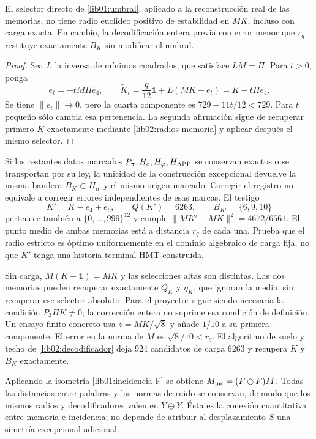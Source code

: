 \begin{proposition}
\label{lib01:umbral-estable}
El selector directo de \eqref{lib01:umbral}, aplicado a la reconstrucción
real de las memorias, no tiene radio euclídeo positivo de estabilidad en
\(MK\), incluso con carga exacta. En cambio, la decodificación entera
previa con error menor que \(r_q\) restituye exactamente \(B_K\)
sin modificar el umbral.
\end{proposition}
\begin{proof}
Sea \(L\) la inversa de mínimos cuadrados, que satisface
\(LM=\Pi\). Para \(t>0\), ponga
\[
 e_t=-tM\Pi e_4,
 \qquad \widetilde K_t=\frac q{12}\mathbf1+L(MK+e_t)
 =K-t\Pi e_4.
\]
Se tiene \(\|e_t\|\to0\), pero la cuarta componente es
\(729-11t/12<729\). Para \(t\) pequeño sólo cambia esa pertenencia.
La segunda afirmación sigue de recuperar primero \(K\) exactamente
mediante \cref{lib02:radios-memoria} y aplicar después el mismo selector.
\end{proof}

Si los restantes datos marcados \(P_\pi,H_e,H_\varphi,H_{\rm APP}\)
se conservan exactos o se transportan por su ley, la unicidad de la
construcción excepcional devuelve la misma bandera
\(B_K\subset H^-_\alpha\) y el mismo origen marcado. Corregir el
registro no equivale a corregir errores independientes de esas marcas.
El testigo
\[
 K'=K-e_4+e_6,
 \qquad Q(K')=6263,\qquad B_{K'}=\{6,9,10\}
\]
pertenece también a \(\{0,\ldots,999\}^{12}\) y cumple
\(\|MK'-MK\|^2=4672/6561\). El punto medio de ambas memorias está
a distancia \(r_q\) de cada una. Prueba que el radio estricto es
óptimo uniformemente en el dominio algebraico de carga fija, no que
\(K'\) tenga una historia terminal HMT construida.

Sin carga, \(M(K-\mathbf1)=MK\) y las selecciones altas son distintas.
Las dos memorias pueden recuperar exactamente \(Q_K\) y \(\eta_K\),
que ignoran la media, sin recuperar ese selector absoluto. Para el
proyector sigue siendo necesaria la condición \(P_3\Pi K\ne0\);
la corrección entera no suprime esa condición de definición. Un ensayo
finito concreto usa \(z=MK/\sqrt8\) y añade \(1/10\) a su primera
componente. El error en la norma de \(M\) es \(\sqrt8/10<r_q\).
El algoritmo de suelo y techo de \cref{lib02:decodificador} deja 924
candidatos de carga 6263 y recupera \(K\) y \(B_K\) exactamente.

Aplicando la isometría \eqref{lib01:incidencia-F} se obtiene
\(M_{\rm inc}=(F\oplus F)M\). Todas las distancias entre palabras
y las normas de ruido se conservan, de modo que los mismos radios y
decodificadores valen en \(Y\oplus Y\). Ésta es la conexión
cuantitativa entre memoria e incidencia; no depende de atribuir al
desplazamiento \(S\) una simetría excepcional adicional.

